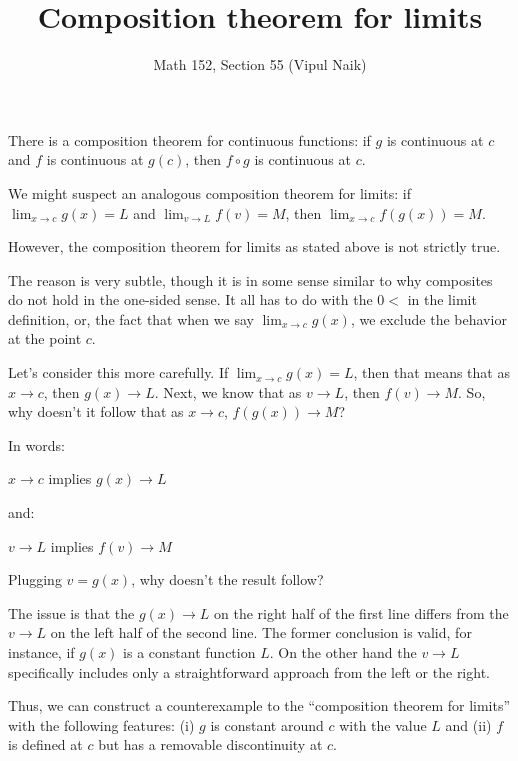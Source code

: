 \documentclass[10pt]{amsart}
\title{Composition theorem for limits}
\author{Math 152, Section 55 (Vipul Naik)}
\begin{document}
\maketitle

There is a composition theorem for continuous functions: if $g$ is
continuous at $c$ and $f$ is continuous at $g(c)$, then $f \circ g$ is
continuous at $c$.

We might suspect an analogous composition theorem for limits: if
$\lim_{x \to c} g(x) = L$ and $\lim_{v \to L} f(v) = M$, then $\lim_{x
\to c} f(g(x)) = M$.

However, the composition theorem for limits as stated above is not
strictly true.

The reason is very subtle, though it is in some sense similar to why
composites do not hold in the one-sided sense. It all has to do with
the $0 <$ in the limit definition, or, the fact that when we say
$\lim_{x \to c} g(x)$, we exclude the behavior at the point $c$.

Let's consider this more carefully. If $\lim_{x \to c} g(x) = L$, then
that means that as $x \to c$, then $g(x) \to L$. Next, we know that as
$v \to L$, then $f(v) \to M$. So, why doesn't it follow that as $x \to
c$, $f(g(x)) \to M$?

In words:

$x \to c$ implies $g(x) \to L$

and:

$v \to L$ implies $f(v) \to M$

Plugging $v = g(x)$, why doesn't the result follow?

The issue is that the $g(x) \to L$ on the right half of the first line
differs from the $v \to L$ on the left half of the second line. The
former conclusion is valid, for instance, if $g(x)$ is a constant
function $L$. On the other hand the $v \to L$ specifically includes
only a straightforward approach from the left or the right.

Thus, we can construct a counterexample to the ``composition theorem
for limits'' with the following features: (i) $g$ is constant around
$c$ with the value $L$ and (ii) $f$ is defined at $c$ but has a
removable discontinuity at $c$.
\end{document}

